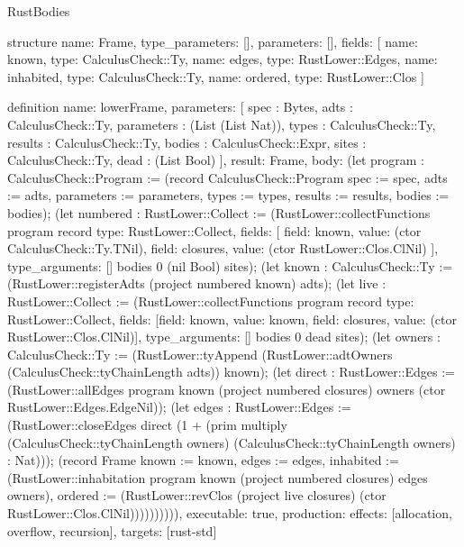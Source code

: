 \begin{lexlean}{RustBodies}
\begin{semanticmodule}
structure{
  name: Frame,
  type_parameters: [],
  parameters: [],
  fields: [
    {name: known, type: CalculusCheck::Ty},
    {name: edges, type: RustLower::Edges},
    {name: inhabited, type: CalculusCheck::Ty},
    {name: ordered, type: RustLower::Clos}
  ]
}

definition{
  name: lowerFrame,
  parameters: [
    spec : Bytes,
    adts : CalculusCheck::Ty,
    parameters : (List (List Nat)),
    types : CalculusCheck::Ty,
    results : CalculusCheck::Ty,
    bodies : CalculusCheck::Expr,
    sites : CalculusCheck::Ty,
    dead : (List Bool)
  ],
  result: Frame,
  body: (let program : CalculusCheck::Program := (record CalculusCheck::Program {spec := spec, adts := adts, parameters := parameters, types := types, results := results, bodies := bodies}); (let numbered : RustLower::Collect := (RustLower::collectFunctions program record{
    type: RustLower::Collect,
    fields: [
      {field: known, value: (ctor CalculusCheck::Ty.TNil)},
      {field: closures, value: (ctor RustLower::Clos.ClNil)}
    ],
    type_arguments: []
  } bodies 0 (nil Bool) sites); (let known : CalculusCheck::Ty := (RustLower::registerAdts (project numbered known) adts); (let live : RustLower::Collect := (RustLower::collectFunctions program record{
    type: RustLower::Collect,
    fields: [{field: known, value: known}, {field: closures, value: (ctor RustLower::Clos.ClNil)}],
    type_arguments: []
  } bodies 0 dead sites); (let owners : CalculusCheck::Ty := (RustLower::tyAppend (RustLower::adtOwners (CalculusCheck::tyChainLength adts)) known); (let direct : RustLower::Edges := (RustLower::allEdges program known (project numbered closures) owners (ctor RustLower::Edges.EdgeNil)); (let edges : RustLower::Edges := (RustLower::closeEdges direct (1 + (prim multiply (CalculusCheck::tyChainLength owners) (CalculusCheck::tyChainLength owners) : Nat))); (record Frame {known := known, edges := edges, inhabited := (RustLower::inhabitation program known (project numbered closures) edges owners), ordered := (RustLower::revClos (project live closures) (ctor RustLower::Clos.ClNil))})))))))),
  executable: true,
  production: {effects: [allocation, overflow, recursion], targets: [rust-std]}
}


\end{semanticmodule}
\end{lexlean}
